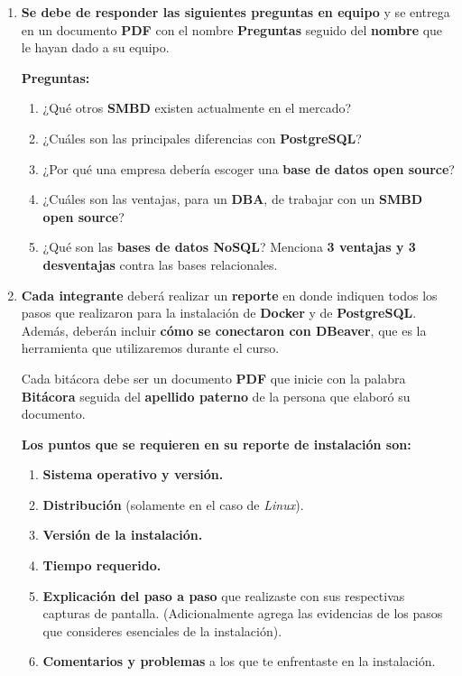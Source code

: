 \documentclass[12pt]{report}
\begin{document}
\begin{enumerate}[label=\roman*.]

\item \textbf{Se debe de responder las siguientes preguntas en equipo} y se entrega en un documento \textbf{PDF} con el nombre \textbf{Preguntas} seguido del \textbf{nombre} que le hayan dado a su equipo.

\medskip

\textbf{Preguntas:}

\begin{enumerate}[label=\textbf{\arabic*.}, itemsep=2.0em]
  \item ¿Qué otros \textbf{SMBD} existen actualmente en el mercado?

  \item ¿Cuáles son las principales diferencias con \textbf{PostgreSQL}?

  \item ¿Por qué una empresa debería escoger una \textbf{base de datos open source}?

  \item ¿Cuáles son las ventajas, para un \textbf{DBA}, de trabajar con un \textbf{SMBD open source}?

  \item ¿Qué son las \textbf{bases de datos NoSQL}? Menciona \textbf{3 ventajas y 3 desventajas} contra las bases relacionales.
\end{enumerate}

\bigskip

\item \textbf{Cada integrante} deberá realizar un \textbf{reporte} en donde indiquen todos los pasos que realizaron para la instalación de \textbf{Docker} y de \textbf{PostgreSQL}. Además, deberán incluir \textbf{cómo se conectaron con DBeaver}, que es la herramienta que utilizaremos durante el curso. 

Cada bitácora debe ser un documento \textbf{PDF} que inicie con la palabra \textbf{Bitácora} seguida del \textbf{apellido paterno} de la persona que elaboró su documento.

\medskip

\textbf{Los puntos que se requieren en su reporte de instalación son:}

\begin{enumerate}[label=\textbf{\arabic*.}, leftmargin=*, itemsep=0.8em]
  \item \textbf{Sistema operativo y versión.}
  \item \textbf{Distribución} (solamente en el caso de \textit{Linux}).
  \item \textbf{Versión de la instalación.}
  \item \textbf{Tiempo requerido.}
  \item \textbf{Explicación del paso a paso} que realizaste con sus respectivas capturas de pantalla. (Adicionalmente agrega las evidencias de los pasos que consideres esenciales de la instalación).
  \item \textbf{Comentarios y problemas} a los que te enfrentaste en la instalación.
\end{enumerate}

\end{enumerate}
\end{document}

